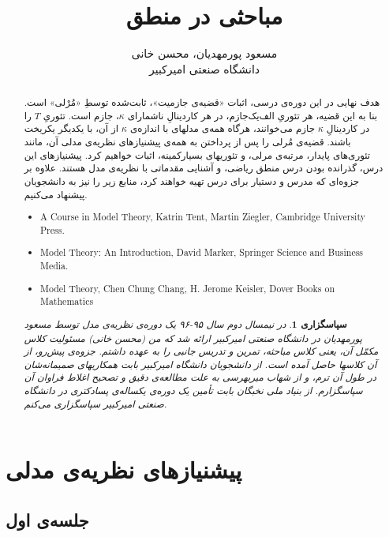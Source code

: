 \documentclass[12pt,a4paper]{report}
\title{مباحثی در منطق}
\author{مسعود پورمهدیان، محسن خانی\\
دانشگاه صنعتی امیرکبیر
}
\theoremstyle{colorhead}
\newtheorem*{sepas}{سپاسگزاری}
\begin{document}
\sloppy 
\maketitle
\begin{abstract}
هدف نهایی در این دوره‌ی درسی، اثبات «قضیه‌ی جازمیت»، ثابت‌شده توسطِ «مُرْلی» است. بنا به این قضیه، هر تئوریِ الف‌یک‌جازم، در هر کاردینالِ ناشمارای 
$\kappa$،
 جازم است. تئوریِ
 $T$
  را در کاردینالِ 
  $\kappa$
   جازم می‌خوانند، هرگاه همه‌ی مدلهای با اندازه‌ی
  $\kappa$
    از آن، با یکدیگر یکریخت باشند. 
قضیه‌ی مُرلی را پس از پرداختن به همه‌ی پیشنیازهای نظریه‌ی مدلی آن، مانند تئوری‌های پایدار، مرتبه‌ی مرلی، و تئوریهای بسیارکمینه، اثبات خواهیم کرد. 
 پیشنیازهای این درس، گذرانده بودن درس منطق ریاضی، و آشنایی مقدماتی با نظریه‌ی مدل هستند. علاوه‌ بر جزوه‌ای که مدرس و دستیار برای درس تهیه خواهند کرد، منابع زیر 
را نیز به دانشجویان پیشنهاد می‌کنیم.
\begin{latin}
\begin{itemize}
\item 
    A Course in Model Theory, Katrin Tent, Martin Ziegler, Cambridge University Press.
\item
Model Theory: An Introduction, David Marker, Springer Science and Business Media.
\item  
Model Theory, Chen Chung Chang, H. Jerome Keisler, Dover Books on Mathematics
\end{itemize}
    \end{latin}
        \begin{sepas}
در
نیمسال دوم سال
۹۵-۹۶
یک دوره‌ی نظریه‌ی مدل توسط مسعود پورمهدیان در دانشگاه صنعتی‌ امیرکبیر ارائه شد
که من (محسن خانی) 
مسئولیت کلاس مکمّل آن، یعنی کلاس مباحثه، تمرین و
تدریس جانبی
را 
به عهده داشتم. جزوه‌ی پیش‌رو، 
از آن کلاسها حاصل آمده است.
 از دانشجویان دانشگاه امیرکبیر
بابت همکاریهای صمیمانه‌شان در طول آن ترم، و از شهاب میربهرسی به علت
مطالعه‌ی دقیق و 
تصحیح 
اغلاط فراوان آن
 سپاسگزارم. از بنیاد ملی نخبگان بابت تأمین
یک  دوره‌ی یکساله‌ی پسادکتری در دانشگاه صنعتی امیرکبیر سپاسگزاری می‌کنم.  
    \end{sepas}
\end{abstract}
\tableofcontents
\pagebreak 
\chapter{پیشنیازهای نظریه‌ی مدلی}
\section{جلسه‌ی اول}
\end{document}
